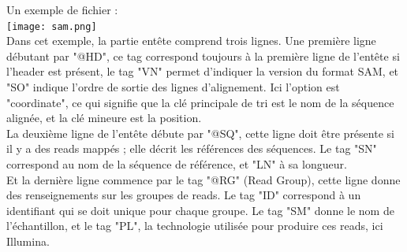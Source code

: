 \documentclass[a4paper,12pt]{article}
\begin{document}
Un exemple de fichier : \\
 \texttt{[image: sam.png]}~\\
Dans cet exemple, la partie entête comprend trois lignes. Une première ligne débutant par "@HD", ce tag correspond toujours à la première ligne de l'entête si l'header est présent, le tag "VN" permet d'indiquer la version du format SAM, et "SO" indique l'ordre de sortie des lignes d'alignement. Ici l'option est "coordinate", ce qui signifie que la clé principale de tri est le nom de la séquence alignée, et la clé mineure est la position. \\
La deuxième ligne de l'entête débute par "@SQ", cette ligne doit être présente si il y a des reads mappés ; elle décrit les références des séquences. Le tag "SN" correspond au nom de la séquence de référence, et "LN" à sa longueur. \\
Et la dernière ligne commence par le tag "@RG" (Read Group), cette ligne donne des renseignements sur les groupes de reads. Le tag "ID" correspond à un identifiant qui se doit unique pour chaque groupe. Le tag "SM" donne le nom de l'échantillon, et le tag "PL", la technologie utilisée pour produire ces reads, ici Illumina. \\
\end{document}
